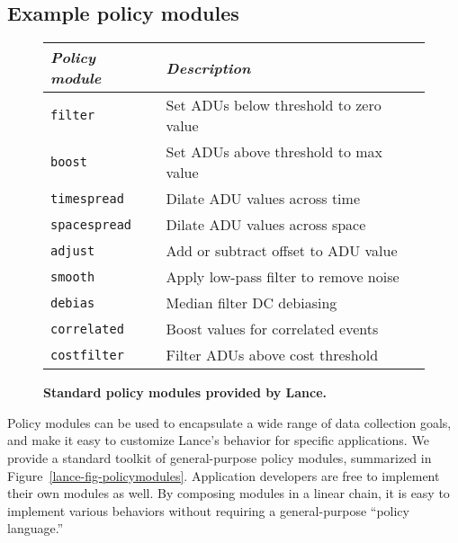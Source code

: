 \subsection{Example policy modules}

\begin{figure}[t]
\label{lance-fig-policymodules}
\begin{center}
\begin{small}
\begin{tabular}{|l|l|} \hline
\textit{Policy module} & \textit{Description} \\ \hline
\texttt{filter} & Set ADUs below threshold to zero value \\
\texttt{boost} & Set ADUs above threshold to max value \\
\texttt{timespread} & Dilate ADU values across time \\
\texttt{spacespread} & Dilate ADU values across space \\
\texttt{adjust} & Add or subtract offset to ADU value \\
\texttt{smooth} & Apply low-pass filter to remove noise \\
\texttt{debias} & Median filter DC debiasing \\
\texttt{correlated} & Boost values for correlated events \\
\texttt{costfilter} & Filter ADUs above cost threshold \\ \hline
\end{tabular}
\end{small}
\end{center}

\caption{\textbf{Standard policy modules provided by Lance.}}

\label{lance-sec-example-policies}
\end{figure}

Policy modules can be used to encapsulate a wide range of data collection
goals, and make it easy to customize Lance's behavior for specific
applications. We provide a standard toolkit of general-purpose policy
modules, summarized in Figure~\ref{lance-fig-policymodules}. Application
developers are free to implement their own modules as well. By composing
modules in a linear chain, it is easy to implement various behaviors without
requiring a general-purpose ``policy language.''

